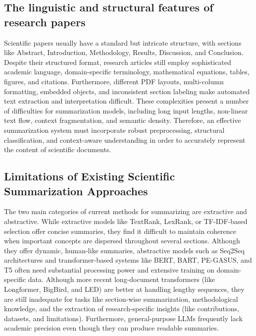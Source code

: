 \documentclass[conference]{IEEEtran}
\begin{document}
\subsection{The linguistic and structural features of research papers}
Scientific papers usually have a standard but intricate structure, with sections like Abstract, Introduction, Methodology, Results, Discussion, and Conclusion.
Despite their structured format, research articles still employ sophisticated academic language, domain-specific terminology, mathematical equations, tables, figures, and citations. Furthermore, different PDF layouts, multi-column formatting, embedded objects, and inconsistent section labeling make automated text extraction and interpretation difficult. These complexities present a number of difficulties for summarization models, including long input lengths, non-linear text flow, context fragmentation, and semantic density. Therefore, an effective summarization system must incorporate robust preprocessing, structural classification, and context-aware understanding in order to accurately represent the content of scientific documents.

\subsection{Limitations of Existing Scientific Summarization Approaches}
 The two main categories of current methods for summarizing are extractive and abstractive. While extractive models like TextRank, LexRank, or TF-IDF-based selection offer concise summaries, they find it difficult to maintain coherence when important concepts are dispersed throughout several sections. Although they offer dynamic, human-like summaries, abstractive models such as Seq2Seq architectures and transformer-based systems like BERT, BART, PE-GASUS, and T5 often need substantial processing power and extensive training on domain-specific data. Although more recent long-document transformers (like Longformer, BigBird, and LED) are better at handling lengthy sequences, they are still inadequate for tasks like section-wise summarization, methodological knowledge, and the extraction of research-specific insights (like contributions, datasets, and limitations). Furthermore, general-purpose LLMs frequently lack academic precision even though they can produce readable summaries.


\begin{table}[htbp]
\caption{Current NLP Models for Summarizing Research Papers.}
\begin{center}
\end{center}
\end{table}
\end{document}

